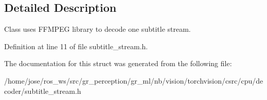 \subsection{Detailed Description}
Class uses F\+F\+M\+P\+EG library to decode one subtitle stream. 

Definition at line 11 of file subtitle\+\_\+stream.\+h.



The documentation for this struct was generated from the following file\+:\begin{DoxyCompactItemize}
\item 
/home/jose/ros\+\_\+ws/src/gr\+\_\+perception/gr\+\_\+ml/nb/vision/torchvision/csrc/cpu/decoder/subtitle\+\_\+stream.\+h\end{DoxyCompactItemize}
